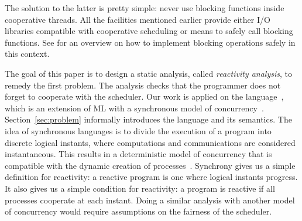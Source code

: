 \documentclass[9pt,preprint]{sigplanconf}
\newcommand{\todo}[1]{ {\color{red} #1}}
\begin{document}

The solution to the latter is pretty simple: never use blocking functions inside cooperative threads. All the facilities mentioned earlier provide either I/O libraries compatible with cooperative scheduling or means to safely call blocking functions. See \cite{Marlow:2004} for an overview on how to implement blocking operations safely in this context.


The goal of this paper is to design a static analysis, called \emph{reactivity analysis}, to remedy the first problem. The analysis checks that the programmer does not forget to cooperate with the scheduler.
%
Our work is applied on the \rml language~\cite{Mandel:2005}, which is an extension of ML with a synchronous model of concurrency~\cite{Benveniste:2003}. Section~\ref{sec:problem} informally introduces the language and its semantics. The idea of synchronous languages is to divide the execution of a program into discrete logical instants, where computations and communications are considered instantaneous. This results in a deterministic model of concurrency that is compatible with the dynamic creation of processes~\cite{Boussinot:1991}.  Synchrony gives us a simple definition for reactivity: a reactive \rml program is one where logical instants progress. It also gives us a simple condition for reactivity: a program is reactive if all processes cooperate at each instant. Doing a similar analysis with another model of concurrency would require assumptions on the fairness of the scheduler. %
\end{document}
